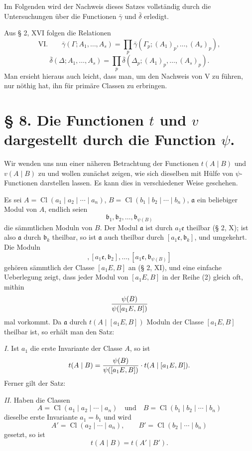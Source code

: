 \documentclass[11pt,a4paper]{article}
\newcommand{\Cl}{\operatorname{Cl}}
\begin{document}
Im Folgenden wird der Nachweis dieses Satzes vollständig durch die Untersuchungen über die Functionen $\bar\gamma$ und $\bar\delta$ erledigt.

Aus § 2, XVI folgen die Relationen
\[
\text{VI.}\qquad
 \bar\gamma(\Gamma;A_1,\ldots,A_s)
 =\prod_p \bar\gamma(\Gamma_p;(A_1)_p,\ldots,(A_s)_p),
\]
\[
 \bar\delta(\Delta;A_1,\ldots,A_s)
 =\prod_p \bar\delta(\Delta_p;(A_1)_p,\ldots,(A_s)_p).
\]
Man ersieht hieraus auch leicht, dass man, um den Nachweis von V zu führen, nur nöthig hat, ihn für primäre Classen zu erbringen.

\section*{§ 8. Die Functionen $t$ und $v$ dargestellt durch die Function $\psi$.}

Wir wenden uns nun einer näheren Betrachtung der Functionen $t(A\mid B)$ und $v(A\mid B)$ zu und wollen zunächst zeigen, wie sich dieselben mit Hülfe von $\psi$-Functionen darstellen lassen. Es kann dies in verschiedener Weise geschehen.

Es sei $A=\Cl(a_1\mid a_2\mid\cdots\mid a_n)$, $B=\Cl(b_1\mid b_2\mid\cdots\mid b_n)$, $\mathfrak a$ ein beliebiger Modul von $A$, endlich seien
\begin{equation}
 \mathfrak b_1,\mathfrak b_2,\ldots,\mathfrak b_{\psi(B)}
\tag{1}
\end{equation}
die sämmtlichen Moduln von $B$. Der Modul $\mathfrak a$ ist durch $a_1\mathfrak e$ theilbar (§ 2, X); ist also $\mathfrak a$ durch $\mathfrak b_k$ theilbar, so ist $\mathfrak a$ auch theilbar durch $[a_1\mathfrak e,\mathfrak b_k]$, und umgekehrt. Die Moduln
\begin{equation}
 [a_1\mathfrak e,\mathfrak b_1],
 [a_1\mathfrak e,\mathfrak b_2],\ldots,
 [a_1\mathfrak e,\mathfrak b_{\psi(B)}]
\tag{2}
\end{equation}
gehören sämmtlich der Classe $[a_1E,B]$ an (§ 2, XI), und eine einfache Ueberlegung zeigt, dass jeder Modul von $[a_1E,B]$ in der Reihe (2) gleich oft, mithin
\[
 {\psi(B)\over\psi([a_1E,B])}
\]
mal vorkommt. Da $\mathfrak a$ durch $t(A\mid [a_1E,B])$ Moduln der Classe $[a_1E,B]$ theilbar ist, so erhält man den Satz:

\emph{I.} Ist $a_1$ die erste Invariante der Classe $A$, so ist
\[
 t(A\mid B)={\psi(B)\over\psi([a_1E,B])}\cdot t(A\mid [a_1E,B]).
\]
Ferner gilt der Satz:

\emph{II.} Haben die Classen
\[
 A=\Cl(a_1\mid a_2\mid\cdots\mid a_n)
 \quad\text{und}\quad
 B=\Cl(b_1\mid b_2\mid\cdots\mid b_n)
\]
dieselbe erste Invariante $a_1=b_1$ und wird
\[
 A'=\Cl(a_2\mid\cdots\mid a_n),
 \qquad
 B'=\Cl(b_2\mid\cdots\mid b_n)
\]
gesetzt, so ist
\[
 t(A\mid B)=t(A'\mid B').
\]
\end{document}
